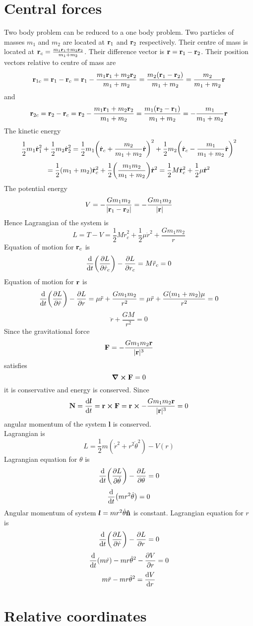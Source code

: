 \documentclass[12pt]{article}
\begin{document}
\section*{Central forces}
Two body problem can be reduced to a one body problem. Two particles of masses $m_1$ and $m_2$ are located at $\vb{r}_1$ and $\vb{r}_2$ respectively. Their centre of mass is located at $\vb{r}_c=\frac{m_1\vb{r}_1+m_2\vb{r}_2}{m_1+m_2}$. Their difference vector is $\vb{r}=\vb{r}_1-\vb{r}_2$. Their position vectors relative to centre of mass are \[\vb{r}_{1c}=\vb{r}_{1}-\vb{r}_{c}=\vb{r}_{1}-\frac{m_1\vb{r}_1+m_2\vb{r}_2}{m_1+m_2}=\frac{m_2(\vb{r}_1-\vb{r}_2)}{m_1+m_2}=\frac{m_2}{m_1+m_2}\vb{r}\] and 
\[\vb{r}_{2c}=\vb{r}_{2}-\vb{r}_{c}=\vb{r}_{2}-\frac{m_1\vb{r}_1+m_2\vb{r}_2}{m_1+m_2}=\frac{m_1(\vb{r}_2-\vb{r}_1)}{m_1+m_2}=-\frac{m_1}{m_1+m_2}\vb{r}\]
The kinetic energy \[\frac{1}{2}m_1\dot{\vb{r}}_1^2+\frac{1}{2}m_2\dot{\vb{r}}_2^2=\frac{1}{2}m_1\qty(\dot{\vb{r}}_{c}+\frac{m_2}{m_1+m_2}\dot{\vb{r}})^2+\frac{1}{2}m_2\qty(\dot{\vb{r}}_{c}-\frac{m_1}{m_1+m_2}\dot{\vb{r}})^2\]
\[=\frac{1}{2}(m_1+m_2)\dot{\vb{r}}_{c}^2+\frac{1}{2}\qty(\frac{m_1m_2}{m_1+m_2})\dot{\vb{r}}^2=\frac{1}{2}M\dot{\vb{r}}_{c}^2+\frac{1}{2}\mu\dot{\vb{r}}^2\]
The potential energy \[V=-\frac{Gm_1m_2}{|\vb{r}_1-\vb{r}_2|}=-\frac{Gm_1m_2}{|\vb{r}|}\]
Hence Lagrangian of the system is \[L=T-V=\frac{1}{2}M\dot{r}_c^2+\frac{1}{2}\mu \dot{r}^2+\frac{Gm_1m_2}{r}\]
Equation of motion for $\vb{r}_c$ is \[\dv{t}\qty(\pdv{L}{\dot{r}_c})-\pdv{L}{r_c}=M\ddot{r}_c=0\]
Equation of motion for $\vb{r}$ is \[\dv{t}\qty(\pdv{L}{\dot{r}})-\pdv{L}{r}=\mu\ddot{r}+\frac{Gm_1m_2}{r^2}=\mu\ddot{r}+\frac{G(m_1+m_2)\mu}{r^2}=0\]
\[\ddot{r}+\frac{GM}{r^2}=0\]
Since the gravitational force \[\vb{F}=-\frac{Gm_1m_2\vb{r}}{|\vb{r}|^3}\]
satisfies \[\curl{\vb{F}}=0\]
it is conservative and energy is conserved.
Since \[\vb{N}=\dv{\bm{l}}{t}=\vb{r}\cp\vb{F}=\vb{r}\cp-\frac{Gm_1m_2\vb{r}}{|\vb{r}|^3}=0\]
angular momentum of the system $\bm{l}$ is conserved.\\
Lagrangian is \[L=\frac{1}{2}m(\dot{r}^2+r^2\dot{\theta}^2)-V(r)\]
Lagrangian equation for $\theta$ is \[\dv{t}\qty(\pdv{L}{\dot{\theta}})-\pdv{L}{\theta}=0\]
\[\dv{t}\qty(mr^2\dot{\theta})=0\]
Angular momentum of system $\bm{l}=mr^2\dot{\theta}\vu{n}$ is constant.
Lagrangian equation for $r$ is \[\dv{t}\qty(\pdv{L}{\dot{r}})-\pdv{L}{r}=0\]
\[\dv{t}\qty(m\dot{r})-mr\dot{\theta}^2-\pdv{V}{r}=0\]
\[m\ddot{r}-mr\dot{\theta}^2=\dv{V}{r}\]

\section*{Relative coordinates}
\end{document}
